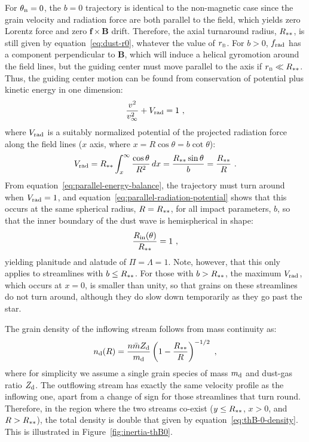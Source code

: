 For \(\theta_{\scriptscriptstyle\text{B}} = 0\), the \(b = 0\) trajectory is identical to the
non-magnetic case since the grain velocity and radiation force are
both parallel to the field, which yields zero Lorentz force and zero
\(\bm{f} \times \bm{B}\) drift. Therefore, the axial turnaround radius,
\(R_{**}\), is still given by equation~\eqref{eq:dust-r0},
whatever the value of \(r_{\scriptscriptstyle\text{B}}\).  For \(b > 0 \), \(f_{\text{rad}}\) has
a component perpendicular to \(\bm{B}\), which will induce a helical
gyromotion around the field lines, but the guiding center must move
parallel to the axis if \(r_{\scriptscriptstyle\text{B}} \ll R_{**}\).  Thus, the guiding
center motion can be found from conservation of potential plus kinetic
energy in one dimension:
\begin{equation}
  \label{eq:parallel-energy-balance}
  \frac{v^2}{v_\infty^2} + V_{\text{rad}} = 1 \ , 
\end{equation}
where \(V_{\text{rad}}\) is a suitably normalized potential of the projected
radiation force along the field lines (\(x\) axis, where
\(x = R \cos\theta = b \cot\theta\)):
\begin{equation}
  \label{eq:parallel-radiation-potential}
  V_{\text{rad}} = R_{**} \int_x^\infty \frac{\cos\theta}{R^2}\, dx
  = \frac{R_{**}\sin\theta}{b}
  = \frac{R_{**}}{R} \ .
\end{equation}
From equation~\eqref{eq:parallel-energy-balance}, the trajectory must
turn around when \(V_{\text{rad}} = 1\), and
equation~\eqref{eq:parallel-radiation-potential} shows that this
occurs at the same spherical radius, \(R = R_{**}\), for all
impact parameters, \(b\), so that the inner boundary of the dust wave
is hemispherical in shape:
\begin{equation}
  \label{eq:thB-0-shape}
  \frac{R_{\text{in}}(\theta)} {R_{**}} = 1 \ ,
\end{equation}
yielding planitude and alatude of \(\Pi = \Lambda = 1\).  Note, however, that
this only applies to streamlines with \(b \le R_{**}\).  For those
with \(b > R_{**}\), the maximum \(V_{\text{rad}}\), which occurs at
\(x = 0\), is smaller than unity, so that grains on these streamlines
do not turn around, although they do slow down temporarily as they go
past the star.

The grain density of the inflowing stream follows from mass continuity as:
\begin{equation}
  \label{eq:thB-0-density}
  n_{\text{d}}(R) = \frac{n \bar{m} Z_{\text{d}}}{m_{\text{d}}}
  \left( 1 - \frac{R_{**}}{R} \right)^{-1/2} \ ,
\end{equation}
where for simplicity we assume a single grain species of mass
\(m_{\text{d}}\) and dust-gas ratio \(Z_{\text{d}}\). The outflowing stream has
exactly the same velocity profile as the inflowing one, apart from a
change of sign for those streamlines that turn round.  Therefore, in
the region where the two streams co-exist (\(y \le R_{**}\),
\(x > 0\), and \(R > R_{**}\)), the total density is double that
given by equation~\eqref{eq:thB-0-density}.  This is illustrated in
Figure~\ref{fig:inertia-thB0}.

